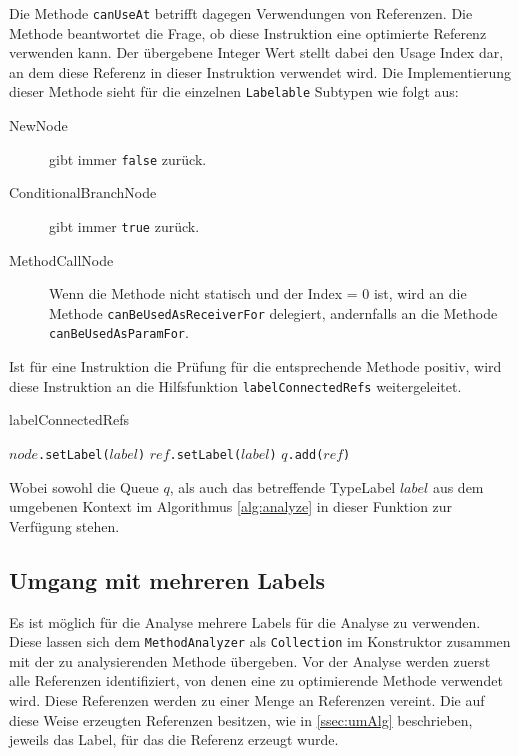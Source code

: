 Die Methode \texttt{canUseAt} betrifft dagegen Verwendungen von Referenzen. Die Methode beantwortet 
die Frage, ob diese Instruktion eine optimierte Referenz verwenden kann. Der übergebene Integer Wert 
stellt dabei den Usage Index dar, an dem diese Referenz in dieser Instruktion verwendet wird. 
Die Implementierung dieser Methode sieht für die einzelnen \texttt{Labelable}
Subtypen wie folgt aus:

\begin{description}
	\item[NewNode] gibt immer \texttt{false} zurück.
	\item[ConditionalBranchNode] gibt immer \texttt{true} zurück.
	\item[MethodCallNode] Wenn die Methode nicht statisch und der Index = 0 ist, wird an die Methode
	\texttt{canBeUsedAsReceiverFor} delegiert, andernfalls an die Methode \texttt{canBeUsedAsParamFor}.
\end{description}

Ist für eine Instruktion die Prüfung für die entsprechende Methode positiv, wird diese 
Instruktion an die Hilfsfunktion \texttt{labelConnectedRefs} weitergeleitet.

\begin{algorithm}[H]
	\caption{labelConnectedRefs}\label{alg:labelConnRefs}
	\begin{algorithmic}[1]
		\STATE \texttt{$node$.setLabel($label$)}
				\STATE \texttt{$ref$.setLabel($label$)}
				\STATE \texttt{$q$.add($ref$)}
			\ENDIF 
		\ENDFOR
	\end{algorithmic}
\end{algorithm}

Wobei sowohl die Queue $q$, als auch das betreffende TypeLabel $label$ aus dem umgebenen Kontext
im Algorithmus \ref{alg:analyze} in dieser Funktion zur Verfügung stehen. 

\subsection{Umgang mit mehreren Labels}

Es ist möglich für die Analyse mehrere Labels für die Analyse zu verwenden. Diese lassen
sich dem \texttt{MethodAnalyzer} als \texttt{Collection} im Konstruktor zusammen 
mit der zu analysierenden Methode übergeben. Vor der Analyse werden zuerst alle Referenzen 
identifiziert, von denen eine zu optimierende Methode verwendet wird. Diese Referenzen werden 
zu einer Menge an Referenzen vereint. Die auf diese Weise erzeugten Referenzen besitzen, 
wie in \ref{ssec:umAlg} beschrieben, jeweils das Label, für das die Referenz erzeugt wurde.

